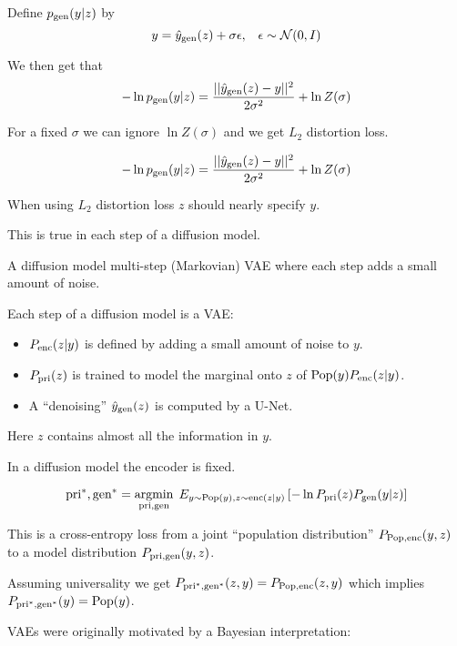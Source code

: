 {Define $p_{\mathrm{gen}}(y|z)$ by
$$y = \hat{y}_{\mathrm{gen}}(z) + \sigma\epsilon,\;\;\;\epsilon \sim {\cal N}(0,I)$$

\vfill
We then get that
$$- \ln p_{\mathrm{gen}}(y|z) = \frac{||\hat{y}_{\mathrm{gen}}(z) - y||^2}{2\sigma^2} + \ln Z(\sigma)$$

\vfill
For a fixed $\sigma$ we can ignore $\ln Z(\sigma)$ and we get $L_2$ distortion loss.


$$- \ln p_{\mathrm{gen}}(y|z) = \frac{||\hat{y}_{\mathrm{gen}}(z) - y||^2}{2\sigma^2} + \ln Z(\sigma)$$

\vfill
When using $L_2$ distortion loss $z$ should nearly specify $y$.

\vfill
This is true in each step of a diffusion model.


\vfill
A diffusion model multi-step (Markovian) VAE where each step adds a small amount of noise.

\vfill
Each step of a diffusion model is a VAE:

\vfill
\begin{itemize}
\item $P_{\mathrm{enc}}(z|y)$ is defined by adding a small amount of noise to $y$.

\vfill
\item $P_{\mathrm{pri}}(z)$ is trained to model the marginal onto $z$ of $\mathrm{Pop}(y)P_{\mathrm{enc}}(z|y)$.

\vfill
\item A ``denoising'' $\hat{y}_{\mathrm{gen}}(z)$ is computed by a U-Net.
\end{itemize}

\vfill
Here $z$ contains almost all the information in $y$.

In a diffusion model the encoder is fixed.

$$\mathrm{pri}^*,\mathrm{gen}^* = \operatorname*{argmin}_{\mathrm{pri},\mathrm{gen}}\;E_{y \sim \mathrm{Pop}(y),z \sim \mathrm{enc}(z|y)}\left[-\ln P_{\mathrm{pri}}(z)P_{\mathrm{gen}}(y|z)\right]$$

\vfill
This is a cross-entropy loss from a joint ``population distribution'' $P_{\mathrm{Pop},\mathrm{enc}}(y,z)$ to a model
distribution $P_{\mathrm{pri},\mathrm{gen}}(y,z)$.

\vfill
Assuming universality we get $P_{\mathrm{pri}^*,\mathrm{gen}^*}(z,y) = P_{\mathrm{Pop},\mathrm{enc}}(z,y)$ which implies {\color{red} $P_{\mathrm{pri}^*,\mathrm{gen}^*}(y) = \mathrm{Pop}(y)$}.


VAEs were originally motivated by a Bayesian interpretation:

}
